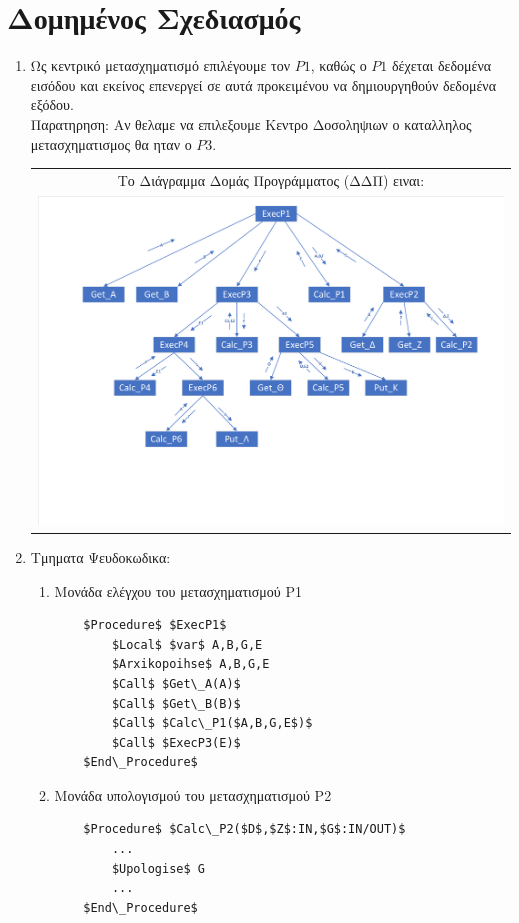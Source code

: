 \documentclass[12pt]{article}
\begin{document}
\section{Δομημένος Σχεδιασμός}
\begin{enumerate}

\item Ως κεντρικό μετασχηματισμό επιλέγουμε τον $P1$, καθώς ο $P1$ 
δέχεται δεδομένα εισόδου και εκείνος επενεργεί σε αυτά προκειμένου να δημιουργηθούν δεδομένα εξόδου.\\
Παρατηρηση: Αν θελαμε να επιλεξουμε Κεντρο Δοσοληψιων ο καταλληλος μετασχηματισμος θα ηταν ο $P3$.

\begin{center}
\begin{tabular}{c}
Το Διάγραμμα Δομάς Προγράμματος (ΔΔΠ) ειναι:\\
\includegraphics[scale=0.5]{MerosG/DDP}
\end{tabular}
\end{center}

\newpage
\item Τμηματα Ψευδοκωδικα:
\begin{enumerate}[label*=\roman*]
	\item Mονάδα ελέγχου του μετασχηματισμού Ρ1
	
	\begin{lstlisting}
	$Procedure$ $ExecP1$
		$Local$ $var$ A,B,G,E
		$Arxikopoihse$ A,B,G,E
		$Call$ $Get\_A(A)$
		$Call$ $Get\_B(B)$
		$Call$ $Calc\_P1($A,B,G,E$)$
		$Call$ $ExecP3(E)$
	$End\_Procedure$
	\end{lstlisting}
	
	\item  Μονάδα υπολογισμού του μετασχηματισμού Ρ2
	\begin{lstlisting}
	$Procedure$ $Calc\_P2($D$,$Z$:IN,$G$:IN/OUT)$
		...
		$Upologise$ G
		...
	$End\_Procedure$
	\end{lstlisting}
	

\end{enumerate}
\end{enumerate}
\end{document}
